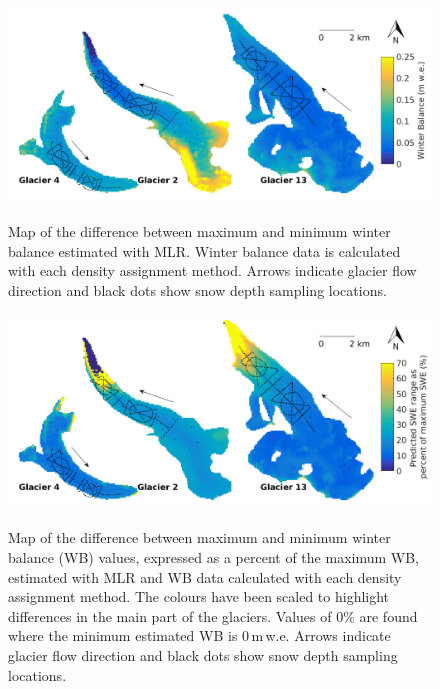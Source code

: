 \documentclass{sfuthesis}
\newcommand{\topomap}{Arrows indicate glacier flow direction and black dots show snow depth sampling locations. }
\begin{document}
\begin{figure}
	\centering
	\includegraphics[width =\textwidth]{MLR_SWEdifferenceMap.png}\\
	\caption{Map of the difference between maximum and minimum winter balance estimated with MLR. Winter balance data is calculated with each density assignment method. \topomap}
	\label{fig:MLR_SWEdiffMap}
\end{figure}

 \begin{figure}
	\centering
	\includegraphics[width =\textwidth]{MLR_SWEdifferenceMap_percent.png}\\
	\caption{Map of the difference between maximum and minimum winter balance (WB) values, expressed as a percent of the maximum WB, estimated with MLR and WB data calculated with each density assignment method. The colours have been scaled to highlight differences in the main part of the glaciers. Values of 0\% are found where the minimum estimated WB is 0\,m\,w.e. \topomap}
	\label{fig:MLR_SWEdiffMapPercent}
\end{figure}
 
\end{document}
